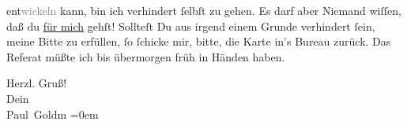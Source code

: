                   ent\textcolor{gray}{wickeln} kann, bin ich verhindert{ }ſelbſt zu gehen. Es darf
               aber Niemand wiſſen, daß du \uline{für mich} gehſt! Sollteſt
               Du aus irgend einem Grunde {\pb}verhindert{ }ſein,  meine Bitte zu erfüllen,{ }ſo{ }ſchicke mir, bitte,  die Karte in’s Bureau
               zurück. Das Referat müßte ich bis übermorgen{ }früh in Händen haben.\pend
           
\pstart
           Herzl. Gruß! {\\[\baselineskip]}Dein {\\[\baselineskip]}\spacefill\mbox{Paul Goldm}\pend
           \leftskip=0em{}\endnumbering{}  \newcommand{\dateiname}{L02658}\newcommand{\titel}{Paul Goldmann an Arthur Schnitzler, 7. 1. 1891}\newcommand{\editorInnen}{Martin Anton Müller und Laura Untner}
